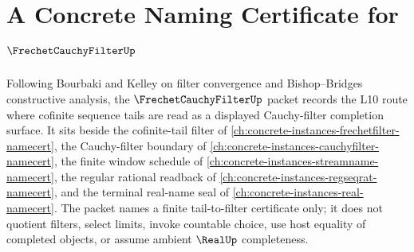 \chapter{A Concrete Naming Certificate for $\FrechetCauchyFilterUp$}
\label{ch:concrete-instances-frechet-cauchy-filter-namecert}

Following Bourbaki and Kelley on filter convergence and Bishop--Bridges constructive analysis, the $\FrechetCauchyFilterUp$ packet records the L10 route where cofinite sequence tails are read as a displayed Cauchy-filter completion surface. It sits beside the cofinite-tail filter of \autoref{ch:concrete-instances-frechetfilter-namecert}, the Cauchy-filter boundary of \autoref{ch:concrete-instances-cauchyfilter-namecert}, the finite window schedule of \autoref{ch:concrete-instances-streamname-namecert}, the regular rational readback of \autoref{ch:concrete-instances-regseqrat-namecert}, and the terminal real-name seal of \autoref{ch:concrete-instances-real-namecert}. The packet names a finite tail-to-filter certificate only; it does not quotient filters, select limits, invoke countable choice, use host equality of completed objects, or assume ambient $\RealUp$ completeness.


